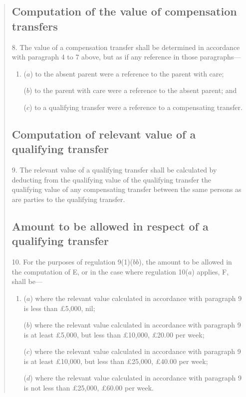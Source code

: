 \documentclass[a4paper]{article}
\begin{document}
\begin{quotation}
\subsection*{Computation of the value of compensation transfers}

8.  The value of a compensation transfer shall be determined in accordance with paragraph 4 to 7 above, but as if any reference in those paragraphs—
\begin{enumerate}\item[]
($a$) to the absent parent were a reference to the parent with care;

($b$) to the parent with care were a reference to the absent parent; and

($c$) to a qualifying transfer were a reference to a compensating transfer.
\end{enumerate}

\subsection*{Computation of relevant value of a qualifying transfer}

9.  The relevant value of a qualifying transfer shall be calculated by deducting from the qualifying value of the qualifying transfer the qualifying value of any compensating transfer between the same persons as are parties to the qualifying transfer.

\subsection*{Amount to be allowed in respect of a qualifying transfer}

10.  For the purposes of regulation 9(1)($bb$), the amount to be allowed in the computation of E, or in the case where regulation 10($a$) applies, F, shall be—
\begin{enumerate}\item[]
($a$) where the relevant value calculated in accordance with paragraph 9 is less than £5,000, nil;

($b$) where the relevant value calculated in accordance with paragraph 9 is at least £5,000, but less than £10,000, £20.00 per week;

($c$) where the relevant value calculated in accordance with paragraph 9 is at least £10,000, but less than £25,000, £40.00 per week;

($d$) where the relevant value calculated in accordance with paragraph 9 is not less than £25,000, £60.00 per week.
\end{enumerate}


\end{quotation}
\end{document}
